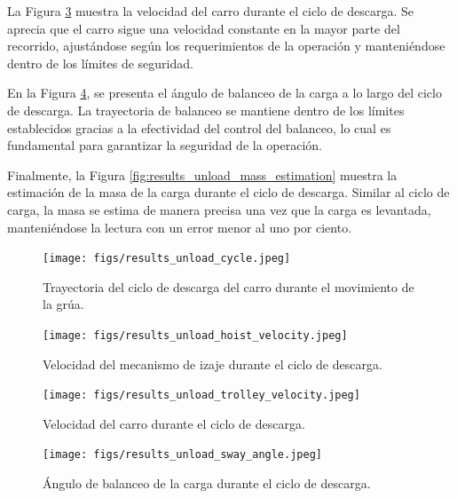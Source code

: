 \documentclass{article}
\begin{document}
            La Figura \ref{fig:results_unload_trolley_velocity} muestra la velocidad del carro durante el ciclo de descarga. Se aprecia que el carro sigue una velocidad constante en la mayor parte del recorrido, ajustándose según los requerimientos de la operación y manteniéndose dentro de los límites de seguridad.

            En la Figura \ref{fig:results_unload_sway_angle}, se presenta el ángulo de balanceo de la carga a lo largo del ciclo de descarga. La trayectoria de balanceo se mantiene dentro de los límites establecidos gracias a la efectividad del control del balanceo, lo cual es fundamental para garantizar la seguridad de la operación.

            Finalmente, la Figura \ref{fig:results_unload_mass_estimation} muestra la estimación de la masa de la carga durante el ciclo de descarga. Similar al ciclo de carga, la masa se estima de manera precisa una vez que la carga es levantada, manteniéndose la lectura con un error menor al uno por ciento.

            \begin{figure} [H]
                \centering
                \texttt{[image: figs/results\_unload\_cycle.jpeg]}
                \caption{Trayectoria del ciclo de descarga del carro durante el movimiento de la grúa.}
                \label{fig:results_unload_cycle}
            \end{figure}

            \begin{figure} [H]
                \centering
                \texttt{[image: figs/results\_unload\_hoist\_velocity.jpeg]}
                \caption{Velocidad del mecanismo de izaje durante el ciclo de descarga.}
                \label{fig:results_unload_hoist_velocity}
            \end{figure}

            \begin{figure} [H]
                \centering
                \texttt{[image: figs/results\_unload\_trolley\_velocity.jpeg]}
                \caption{Velocidad del carro durante el ciclo de descarga.}
                \label{fig:results_unload_trolley_velocity}
            \end{figure}

            \begin{figure} [H]
                \centering
                \texttt{[image: figs/results\_unload\_sway\_angle.jpeg]}
                \caption{Ángulo de balanceo de la carga durante el ciclo de descarga.}
                \label{fig:results_unload_sway_angle}
            \end{figure}
\end{document}
